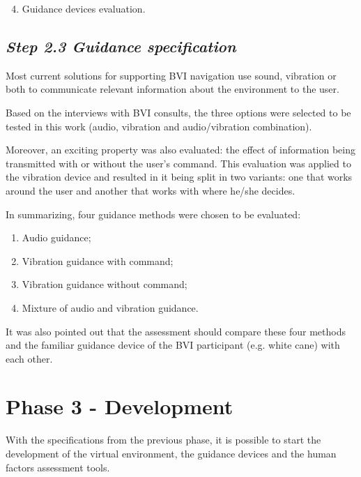         \begin{enumerate} [label = \Alph*)]
            \setcounter{enumi}{3}
            \item Guidance devices evaluation.
        \end{enumerate}

    \subsection*{\textit{Step 2.3 Guidance specification}}
        Most current solutions for supporting BVI navigation use sound, vibration or both to communicate relevant information about the environment to the user. 

        Based on the interviews with BVI consults, the three options were selected to be tested in this work (audio, vibration and audio/vibration combination). 

        Moreover, an exciting property was also evaluated: the effect of information being transmitted with or without the user's command. This evaluation was applied to the vibration device and resulted in it being split in two variants: one that works around the user and another that works with where he/she decides.

        In summarizing, four guidance methods were chosen to be evaluated:
        \begin{enumerate} [label = \Alph*)]
            \item Audio guidance;
            \item Vibration guidance with command;
            \item Vibration guidance without command;
            \item Mixture of audio and vibration guidance.
        \end{enumerate}

        It was also pointed out that the assessment should compare these four methods and the familiar guidance device of the BVI participant (e.g. white cane) with each other.
    
    
\section{Phase 3 - Development}
\label{sec:creation_phase}
    
    With the specifications from the previous phase, it is possible to start the development of the virtual environment, the guidance devices and the human factors assessment tools.

